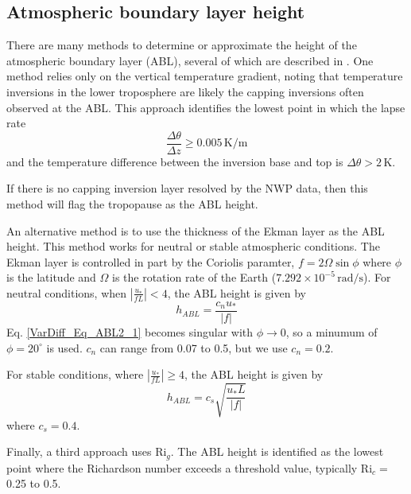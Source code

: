 \subsection{Atmospheric boundary layer height}

There are many methods to determine or approximate the height of the atmospheric boundary
layer (ABL), several of which are described in \cite{Sugiyama1999}. One method relies only on the
vertical temperature gradient, noting that temperature inversions in the lower troposphere
are likely the capping inversions often observed at the ABL. This
approach identifies the lowest point in which the lapse rate
\begin{equation}\label{VarDiff_Eq_ABL1}
\frac{\Delta \theta}{\Delta z} \ge 0.005 \, \mathrm{K} / \mathrm{m}
\end{equation}
and the temperature difference between the inversion base and top
is $\Delta \theta > 2 \, \mathrm{K}$.

If there is no capping inversion layer resolved by the NWP data, then this method
will flag the tropopause as the ABL height.

An alternative method is to use the thickness of the Ekman layer as the ABL height.
This method works for neutral or stable atmospheric conditions. The Ekman layer is
controlled in part by the Coriolis paramter, $f=2 \Omega \sin \phi$ where $\phi$
is the latitude and $\Omega$ is the rotation rate of the Earth
($7.292 \times 10^{-5} \, \mathrm{rad/s}$).  For neutral conditions,
when $\left| \frac{u_*}{f L}\right| < 4$, the ABL height is given by
\begin{equation}\label{VarDiff_Eq_ABL2_1}
h_{ABL} = \frac{c_n u_*}{|f|}
\end{equation}
Eq. \ref{VarDiff_Eq_ABL2_1} becomes singular with $\phi \rightarrow 0$, so a minumum
of $\phi=20^{\circ}$ is used. $c_n$ can range from 0.07 to 0.5, but we use $c_n=0.2$.

For stable conditions, where $\left| \frac{u_*}{f L}\right| \ge 4$, the ABL height is given by
\begin{equation}\label{VarDiff_Eq_ABL2_2}
h_{ABL} = c_s \sqrt{\frac{u_* L}{|f|}}
\end{equation}
where $c_s=0.4$.

Finally, a third approach uses $\mathrm{Ri}_g$. The ABL height is identified as the
lowest point where the Richardson number exceeds a threshold value, typically $\mathrm{Ri}_c=$ 0.25 to
0.5.

